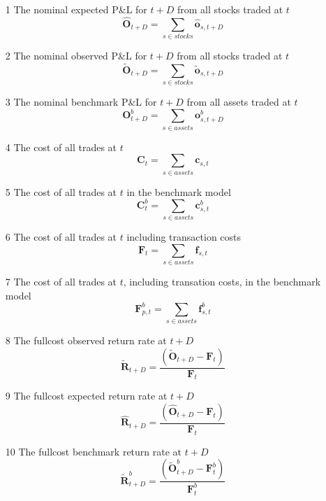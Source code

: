 \documentclass[a4paper,11pt,oneside]{article}
\theoremstyle{plain}
\theoremstyle{definition}
\begin{document}
		\begin{itemize}
			\item [1] The nominal expected P\&L for $t+D$ from all stocks traded at $t$
			\begin{equation}
				\mathbf{\hat{O}}_{t+D} = \sum_{s \in stocks} \mathbf{\hat{o}}_{s, {t+D}}
			\end{equation}
			\item [2] The nominal observed P\&L for $t+D$ from all stocks traded at $t$
			\begin{equation}
				\mathbf{\tilde{O}}_{t+D} = \sum_{s \in stocks} \mathbf{\tilde{o}}_{s, {t+D}}
			\end{equation}
			\item [3] The nominal benchmark P\&L for $t+D$ from all assets traded at $t$
			\begin{equation}
				\mathbf{O}^b_{t+D} = \sum_{s \in assets} \mathbf{o}^b_{s, {t+D}}
			\end{equation}
			
			\item [4] The cost of all trades at $t$
				\begin{equation}
				\mathbf{C}_t = \sum_{s \in assets} \mathbf{c}_{s,t}
				\end{equation}
			\item [5] The cost of all trades at $t$ in the benchmark model
				\begin{equation}
				\mathbf{C}^b_{t} = \sum_{s \in assets} \mathbf{c}^b_{s ,t}
				\end{equation}
			\item [6] The cost of all trades at $t$ including transaction costs
				\begin{equation}
				\mathbf{F}_t = \sum_{s \in assets} \mathbf{f}_{s,t}
				\end{equation}
			\item [7] The cost of all trades at $t$, including transation costs, in the benchmark model	
				\begin{equation}
				\mathbf{F}^b_{p,t} = \sum_{s \in assets} \mathbf{f}^b_{s,t}
				\end{equation}	
		
		
		
		
			\item [8] The fullcost observed return rate at $t+D$
				\begin{equation}
				\mathbf{\tilde{R}}_{t + D} = \frac{\left( \mathbf{\tilde{O}}_{t+D} - \mathbf{F}_t \right) }
				{\mathbf{F}_t}
				\end{equation}	
			\item [9] The fullcost expected return rate at $t+D$
				\begin{equation}
				\mathbf{\hat{R}}_{t + D} = \frac{\left( \mathbf{\hat{O}}_{t+D} - \mathbf{F}_t \right) }
				{\mathbf{F}_t}
				\end{equation}
			\item [10] The fullcost benchmark return rate at $t+D$
				\begin{equation}
				\mathbf{\tilde{R}}^b_{t + D} = \frac{\left( \mathbf{\tilde{O}}^b_{t+D} - \mathbf{F}^b_t \right) }
				{\mathbf{F}^b_t}
				\end{equation}	
		

\end{itemize}
\end{document}
